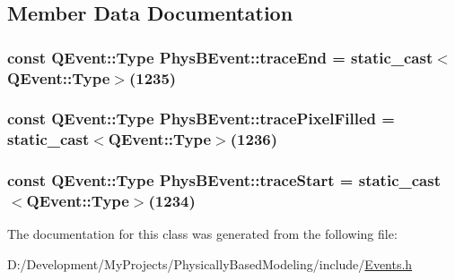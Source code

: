 \subsection{Member Data Documentation}
\hypertarget{class_phys_b_event_a56d494f3a63d0b992c8083a3fb3a8a4c}{
\subsubsection[{trace\-End}]{\setlength{\rightskip}{0pt plus 5cm}const Q\-Event\-::\-Type Phys\-B\-Event\-::trace\-End = static\-\_\-cast$<$Q\-Event\-::\-Type$>$(1235)\hspace{0.3cm}{\ttfamily [static]}}}\label{class_phys_b_event_a56d494f3a63d0b992c8083a3fb3a8a4c}
\hypertarget{class_phys_b_event_a189bab4e3463356d8ef0020562a0ea53}{
\subsubsection[{trace\-Pixel\-Filled}]{\setlength{\rightskip}{0pt plus 5cm}const Q\-Event\-::\-Type Phys\-B\-Event\-::trace\-Pixel\-Filled = static\-\_\-cast$<$Q\-Event\-::\-Type$>$(1236)\hspace{0.3cm}{\ttfamily [static]}}}\label{class_phys_b_event_a189bab4e3463356d8ef0020562a0ea53}
\hypertarget{class_phys_b_event_a7ab5c424201f6461af7721d81310968c}{
\subsubsection[{trace\-Start}]{\setlength{\rightskip}{0pt plus 5cm}const Q\-Event\-::\-Type Phys\-B\-Event\-::trace\-Start = static\-\_\-cast$<$Q\-Event\-::\-Type$>$(1234)\hspace{0.3cm}{\ttfamily [static]}}}\label{class_phys_b_event_a7ab5c424201f6461af7721d81310968c}


The documentation for this class was generated from the following file\-:\begin{DoxyCompactItemize}
\item 
D\-:/\-Development/\-My\-Projects/\-Physically\-Based\-Modeling/include/\hyperlink{_events_8h}{Events.\-h}\end{DoxyCompactItemize}
